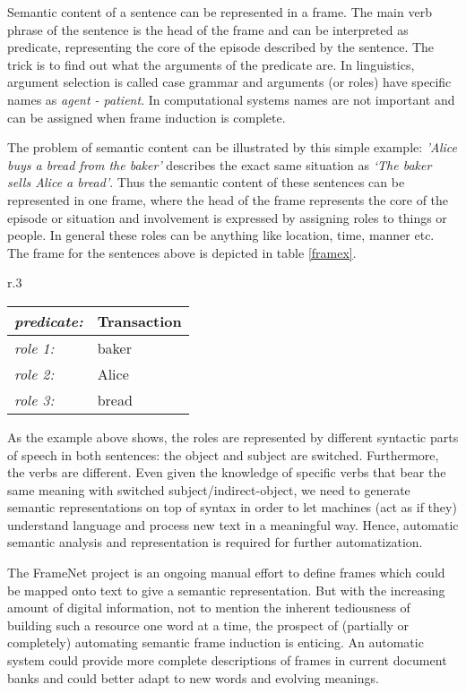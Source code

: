 \documentclass{article} %
\begin{document}
Semantic content of a sentence can be represented in a frame. The main verb phrase of the sentence is the head of the frame and can be interpreted as predicate, representing the core of the episode described by the sentence. The trick is to find out what the arguments of the predicate are. In linguistics, argument selection is called case grammar \citep{dowty1991} and arguments (or roles) have specific names as \textit{agent - patient}. In computational systems names are not important and can be assigned when frame induction is complete.

The problem of semantic content can be illustrated by this simple example: \textit{'Alice buys a bread from the baker'} describes the exact same situation as \textit{`The baker sells Alice a bread'}. Thus the semantic content of these sentences can be represented in one frame, where the head of the frame represents the core of the episode or situation and involvement is expressed by assigning roles to things or people. In general these roles can be anything like location, time, manner etc. The frame for the sentences above is depicted in table \ref{framex}.
\begin{wraptable}{r}{.3\textwidth}
  \centering
\begin{tabular}{|l l|}
  \hline
  \textit{\small predicate:\normalsize}&Transaction\\
  \hline
  \hline
  \textit{\small role 1:\normalsize} &baker\\
  \textit{\small role 2:\normalsize} &Alice\\
  \textit{\small role 3:\normalsize} &bread\\
  \hline
\end{tabular}
\caption{Simple frame}
\label{framex}
\end{wraptable}
As the example above shows, the roles are represented by different syntactic parts of speech in both sentences: the object and subject are switched. Furthermore, the verbs are different. Even given the knowledge of specific verbs that bear the same meaning with switched subject/indirect-object, we need to generate semantic representations on top of syntax in order to let machines (act as if they) understand language and process new text in a meaningful way. Hence, automatic semantic analysis and representation is required for further automatization.

The FrameNet project \citep{framenet} is an ongoing manual effort to define frames which could be mapped onto text to give a semantic representation. But with the increasing amount of digital information, not to mention the inherent tediousness of building such a resource one word at a time, the prospect of (partially or completely) automating semantic frame induction is enticing. An automatic system could provide more complete descriptions of frames in current document banks and could better adapt to new words and evolving meanings.
\end{document}
